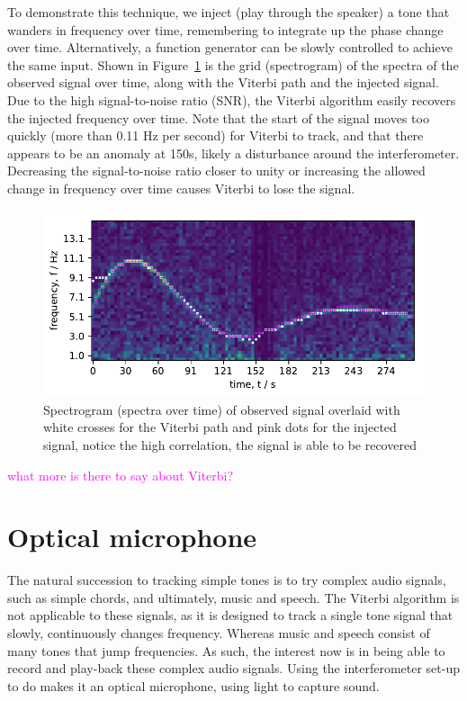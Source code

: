 \documentclass[prb,preprint]{revtex4-1}
\newcommand{\jam}{\textcolor{magenta}}
\begin{document}
To demonstrate this technique, we inject (play through the speaker) a tone that wanders in frequency over time, remembering to integrate up the phase change over time. Alternatively, a function generator can be slowly controlled to achieve the same input. Shown in Figure~\ref{fig:viterbi_overlay} is the grid (spectrogram) of the spectra of the observed signal over time, along with the Viterbi path and the injected signal. Due to the high signal-to-noise ratio (SNR), the Viterbi algorithm easily recovers the injected frequency over time. Note that the start of the signal moves too quickly (more than 0.11 Hz per second) for Viterbi to track, and that there appears to be an anomaly at 150s, likely a disturbance around the interferometer. Decreasing the signal-to-noise ratio closer to unity or increasing the allowed change in frequency over time causes Viterbi to lose the signal.


\begin{figure}
	\includegraphics[width=\textwidth]{expt_overlay_2_viterbi_test_webcam.pdf}
	\caption{Spectrogram (spectra over time) of observed signal overlaid with white crosses for the Viterbi path and pink dots for the injected signal, notice the high correlation, the signal is able to be recovered}
	\label{fig:viterbi_overlay}
\end{figure}

\jam{what more is there to say about Viterbi?}

\section{Optical microphone}

The natural succession to tracking simple tones is to try complex audio signals, such as simple chords, and ultimately, music and speech. The Viterbi algorithm is not applicable to these signals, as it is designed to track a single tone signal that slowly, continuously changes frequency. Whereas music and speech consist of many tones that jump frequencies. As such, the interest now is in being able to record and play-back these complex audio signals. Using the interferometer set-up to do makes it an optical microphone, using light to capture sound.
\end{document}
